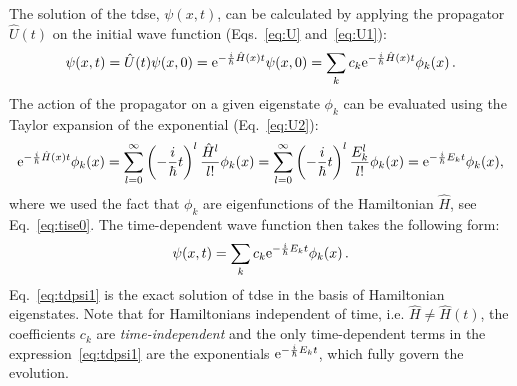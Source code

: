 The solution of the \acrshort{tdse}, $\psi(x,t)$, can be calculated by applying the propagator $\hat{U}(t)$ on the initial wave function (Eqs.~\eqref{eq:U} and~\eqref{eq:U1}):
\begin{equation}
    \psi(x,t) = \hat{U}(t)\psi(x,0) = \mathrm{e}^{-\frac{i}{\hbar}\hat{H}(x)t} \psi(x,0) = \sum_k c_k \mathrm{e}^{-\frac{i}{\hbar}\hat{H}(x)t} \phi_k(x) \, .
\end{equation}
The action of the propagator on a given eigenstate $\phi_k$ can be evaluated using the Taylor expansion of the exponential (Eq.~\eqref{eq:U2}):
\begin{equation}
    \mathrm{e}^{-\frac{i}{\hbar}\hat{H}(x)t} \phi_k(x) = \sum_{l=0}^\infty \left( -\frac{i}{\hbar} t\right)^l \frac{\hat{H}^l}{l!} \phi_k(x) = \sum_{l=0}^\infty \left( -\frac{i}{\hbar} t\right)^l \frac{E_k^l}{l!}  \phi_k(x) = \mathrm{e}^{-\frac{i}{\hbar}E_k t} \phi_k(x),
\end{equation}
where we used the fact that $\phi_k$ are eigenfunctions of the Hamiltonian $\hat{H}$, see Eq.~\eqref{eq:tise0}. The time-dependent wave function then takes the following form:
\begin{equation}
    \psi(x,t) = \sum_k c_k \mathrm{e}^{-\frac{i}{\hbar}E_k t}\phi_k(x) \, .
    \label{eq:tdpsi1}
\end{equation}
Eq.~\eqref{eq:tdpsi1} is the exact solution of \acrshort{tdse} in the basis of Hamiltonian eigenstates. Note that for Hamiltonians independent of time, i.e. $\hat{H} \neq \hat{H}(t)$, the coefficients $c_k$ are \textit{time-independent} and the only time-dependent terms in the expression~\eqref{eq:tdpsi1} are the exponentials $\mathrm{e}^{-\frac{i}{\hbar}E_k t}$, which fully govern the evolution.

